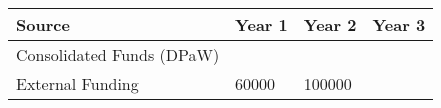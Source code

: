 \documentclass[version=last, 
    paper=a4, %
    10pt, %
    usenames,
    dvipsnames, 
    oneside, %
    headings=openany, %
    DIV=15 %
]{scrbook}
\begin{document}
\begin{longtabu} to \linewidth { |  X | X | X | X | }
\hline
{}
Source & Year 1 & Year 2 & Year 3\\
\hline
\endhead



Consolidated Funds (DPaW) &  &  & \\



External Funding & 60000 & 100000 & \\


\hline
\end{longtabu}






\end{document}
